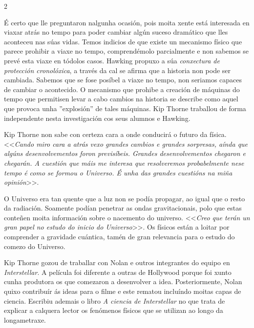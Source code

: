 \begin{multicols}{2}

É certo que lle preguntaron nalgunha ocasión, pois moita xente está interesada
en viaxar atrás no tempo para poder cambiar algún suceso dramático que lles
aconteceu nas súas vidas. Temos indicios de que existe un mecanismo físico que
parece prohibir a viaxe no tempo, comprendémolo parcialmente e non sabemos se
prevé esta viaxe en tódolos casos. Hawking propuxo a súa \emph{conxectura de
protección cronolóxica}, a través da cal se afirma que a historia non pode ser
cambiada. Sabemos que se fose posíbel a viaxe no tempo, non seriamos capaces de
cambiar o acontecido. O mecanismo que prohibe a creación de máquinas do tempo
que permitisen levar a cabo cambios na historia se describe como aquel que
provoca unha ''explosión'' de tales máquinas. Kip Thorne traballou de forma
independente nesta investigación cos seus alumnos e Hawking.


Kip Thorne non sabe con certeza cara a onde conducirá o futuro da física.
<<\emph{Cando miro cara a atrás vexo grandes cambios e grandes sorpresas, aínda
que algúns desenvolvementos foron previsíbeis. Grandes desenvolvementos
chegaron e chegarán. A cuestión que máis me interesa que resolveremos
probabelmente nese tempo é como se formou o Universo. É unha das grandes
cuestións na miña opinión}>>.


O Universo era tan quente que a luz non se podía propagar, ao igual que o resto
da radiación. Soamente podían penetrar as ondas gravitacionais, polo que estas
conteñen moita información sobre o nacemento do universo. <<\emph{Creo que
terán un gran papel no estudo do inicio do Universo}>>. Os físicos están a
loitar por comprender a gravidade cuántica, tamén de gran relevancia para o
estudo do comezo do Universo.


Kip Thorne gozou de traballar con Nolan e outros integrantes do equipo en
\emph{Interstellar}. A película foi diferente a outras de Hollywood porque foi
xunto cunha produtora os que comezaron a desenvolver a idea. Posteriormente,
Nolan quixo contribuír ás ideas para o filme e este rematou incluíndo moitas
capas de ciencia. Escribiu ademais o libro \emph{A ciencia de Interstellar} no
que trata de explicar a calquera lector os fenómenos físicos que se utilizan ao
longo da longametraxe.


\end{multicols}
